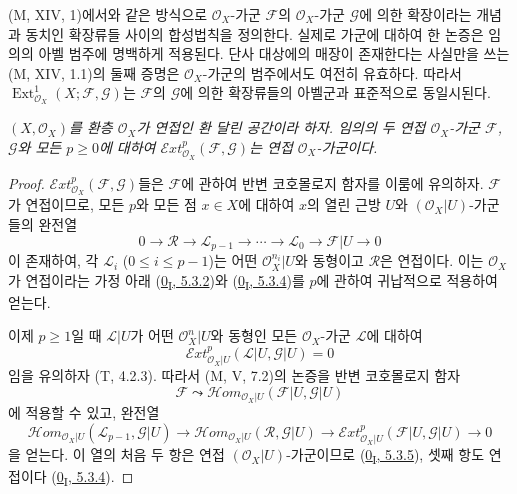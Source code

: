 \begin{env}[12.3.2]
\label{0.12.3.2-fr}
(M, XIV, 1)에서와 같은 방식으로 $\mathcal O_X$-가군 $\mathcal F$의
$\mathcal O_X$-가군 $\mathcal G$에 의한 확장이라는 개념과 동치인
확장류들 사이의 합성법칙을 정의한다. 실제로 가군에 대하여 한 논증은
임의의 아벨 범주에 명백하게 적용된다. 단사 대상에의 매장이 존재한다는
사실만을 쓰는 (M, XIV, 1.1)의 둘째 증명은 $\mathcal O_X$-가군의
범주에서도 여전히 유효하다. 따라서
$\operatorname{Ext}_{\mathcal O_X}^1(X;\mathcal F,\mathcal G)$는
$\mathcal F$의 $\mathcal G$에 의한 확장류들의 아벨군과 표준적으로
동일시된다.
\end{env}

\begin{proposition}[12.3.3]
\label{0.12.3.3-fr}
\emph{$(X,\mathcal O_X)$를 환층 $\mathcal O_X$가 연접인 환 달린
공간이라 하자. 임의의 두 연접 $\mathcal O_X$-가군 $\mathcal F$,
$\mathcal G$와 모든 $p\geq0$에 대하여
$\mathcal{E}xt_{\mathcal O_X}^p(\mathcal F,\mathcal G)$는 연접
$\mathcal O_X$-가군이다.}
\end{proposition}

\begin{proof}
$\mathcal{E}xt_{\mathcal O_X}^p(\mathcal F,\mathcal G)$들은
$\mathcal F$에 관하여 반변 코호몰로지 함자를 이룸에 유의하자.
$\mathcal F$가 연접이므로, 모든 $p$와 모든 점 $x\in X$에 대하여
$x$의 열린 근방 $U$와 $(\mathcal O_X|U)$-가군들의 완전열
\[
0\longrightarrow\mathcal R\longrightarrow\mathcal L_{p-1}
\longrightarrow\cdots\longrightarrow\mathcal L_0
\longrightarrow\mathcal F|U\longrightarrow0
\]
이 존재하여, 각 $\mathcal L_i$ ($0\leq i\leq p-1$)는 어떤
$\mathcal O_X^{n_i}|U$와 동형이고 $\mathcal R$은 연접이다. 이는
$\mathcal O_X$가 연접이라는 가정 아래
(\hyperref[0.5.3.2-ko]{0\textsubscript{I}, 5.3.2})와
(\hyperref[0.5.3.4-ko]{0\textsubscript{I}, 5.3.4})를 $p$에 관하여
귀납적으로 적용하여 얻는다.

이제 $p\geq1$일 때 $\mathcal L|U$가 어떤 $\mathcal O_X^n|U$와
동형인 모든 $\mathcal O_X$-가군 $\mathcal L$에 대하여
\[
\mathcal{E}xt_{\mathcal O_X|U}^p(\mathcal L|U,\mathcal G|U)=0
\]
임을 유의하자 (T, 4.2.3). 따라서 (M, V, 7.2)의 논증을 반변
코호몰로지 함자
\[
\mathcal F\leadsto
\mathcal{H}om_{\mathcal O_X|U}(\mathcal F|U,\mathcal G|U)
\]
에 적용할 수 있고, 완전열
\[
\mathcal{H}om_{\mathcal O_X|U}(\mathcal L_{p-1},\mathcal G|U)
\longrightarrow
\mathcal{H}om_{\mathcal O_X|U}(\mathcal R,\mathcal G|U)
\longrightarrow
\mathcal{E}xt_{\mathcal O_X|U}^p(\mathcal F|U,\mathcal G|U)
\longrightarrow0
\]
을 얻는다. 이 열의 처음 두 항은 연접 $(\mathcal O_X|U)$-가군이므로
(\hyperref[0.5.3.5-ko]{0\textsubscript{I}, 5.3.5}), 셋째 항도 연접이다
(\hyperref[0.5.3.4-ko]{0\textsubscript{I}, 5.3.4}).
\end{proof}

